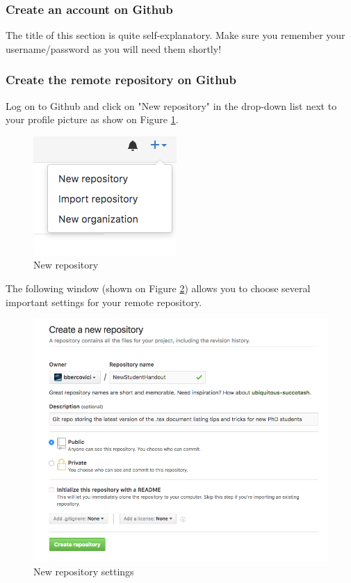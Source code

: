 \subsubsection{Create an account on Github}
The title of this section is quite self-explanatory. Make sure you remember your username/password as you will need them shortly!
\subsubsection{Create the remote repository on Github}
Log on to Github and click on "New repository" in the drop-down list next to your profile picture as show on Figure \ref{fig:new_repo}.
\begin{figure}[H]
\centering
\includegraphics[scale=0.5]{new_repo}
\caption{New repository}
\label{fig:new_repo}
\end{figure}

The following window (shown on Figure \ref{fig:new_repo_settings}) allows you to choose several important settings for your remote repository.
\begin{figure}[H]
\centering
\includegraphics[scale=0.6]{new_repo_settings}
\caption{New repository settings}
\label{fig:new_repo_settings}
\end{figure}

